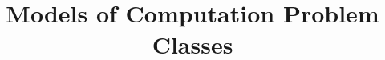 \documentclass[a4paper, answers]{exam}
\title{Models of Computation Problem Classes}
\author{}
\begin{document}
    \maketitle
    \begin{questions}
%       
        
    \end{questions}
\end{document}
